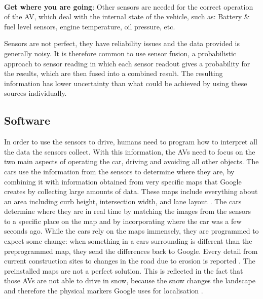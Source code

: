 \documentclass[11pt]{article}
\begin{document}
$~$\\
\textbf{Get where you are going}:
Other sensors are needed for the correct operation of the AV, which deal with the internal state of the vehicle, such as: Battery \& fuel level sensors, engine temperature, oil pressure, etc.

Sensors are not perfect, they have reliability issues and the data provided is generally noisy. It is therefore common to use sensor fusion, a probabilistic approach to sensor reading in which each sensor readout gives a probability for the results, which are then fused into a combined result. The resulting information has lower uncertainty than what could be achieved by using these sources individually. \cite{HellstromUmea}

\subsection{Software}
In order to use the sensors to drive, humans need to program how to interpret all the data the sensors collect. With this information, the AVs need to focus on the two main aspects of operating the car, driving and avoiding all other objects. The cars use the information from the sensors to determine where they are, by combining it with information obtained from very specific maps that Google creates by collecting large amounts of data. These maps include everything about an area including curb height, intersection width, and lane layout \cite{chrisurmson2016}.
The cars determine where they are in real time by matching the images from the sensors to a specific place on the map and by incorporating where the car was a few seconds ago. While the cars rely on the maps immensely, they are programmed to expect some change: when something in a cars surrounding is different than the preprogrammed map, they send the differences back to Google. Every detail from current construction sites to changes in the road due to erosion is reported \cite{chrisurmson2016}. The preinstalled maps are not a perfect solution. This is reflected in the fact that those AVs are not able to drive in snow, because the snow changes the landscape and therefore the physical markers Google uses for localisation \cite{chrisurmson2016}. 
\end{document}
